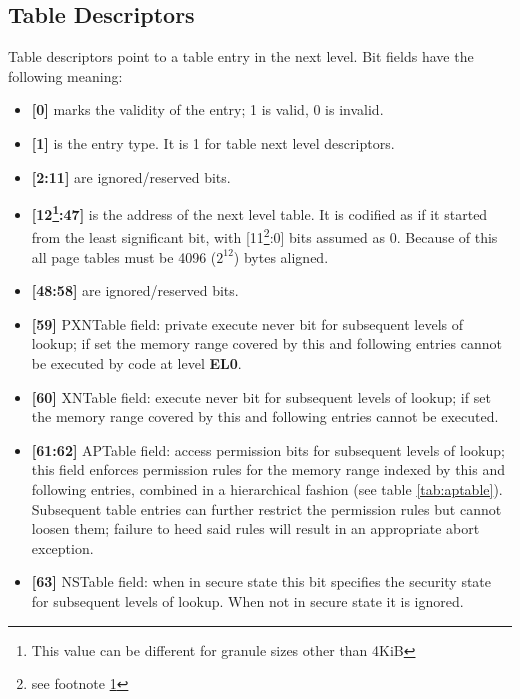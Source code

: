 \documentclass[12pt,a4paper,openright,twoside]{report}
\begin{document}
\subsection{Table Descriptors}
Table descriptors point to a table entry in the next level. Bit fields have the 
following meaning:
\begin{itemize}
    \item \textbf{[0]} marks the validity of the entry; 1 is valid, 0 is invalid.
    \item \textbf{[1]} is the entry type. It is 1 for table next level descriptors.
    \item \textbf{[2:11]} are ignored/reserved bits.
    \item \textbf{[12\footnote{\label{4knote} This value can be different for granule
        sizes other than 4KiB}:47]} is the address of the next level table. It is codified
        as if it started from the least significant bit, with 
        [11\footnote{see footnote \ref{4knote}}:0] bits assumed
        as 0. Because of this all page tables must be 4096 ($2^{12}$) bytes aligned.
    \item \textbf{[48:58]} are ignored/reserved bits.
    \item \textbf{[59]} PXNTable field: private execute never bit for subsequent
        levels of lookup; if set the memory range covered by this and following entries
        cannot be executed by code at level \textbf{EL0}.
    \item \textbf{[60]} XNTable field: execute never bit for subsequent levels
        of lookup; if set the memory range covered by this and following entries
        cannot be executed.
    \item \textbf{[61:62]} APTable field: access permission bits for subsequent levels
        of lookup; this field enforces permission rules for the memory range
        indexed by this and following entries, combined in a hierarchical 
        fashion (see table \ref{tab:aptable}). Subsequent table entries can
        further restrict the permission rules but cannot loosen them; failure
        to heed said rules will result in an appropriate abort exception.
    \item \textbf{[63]} NSTable field: when in secure state this bit specifies
        the security state for subsequent levels of lookup. When not in secure state
        it is ignored.
\end{itemize}
\end{document}
